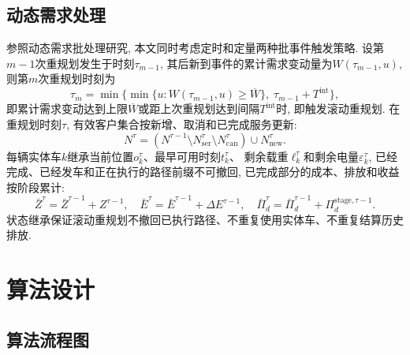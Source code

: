 \documentclass{setp-new}
\begin{document}
\subsection{动态需求处理}

参照动态需求批处理研究\cite{ref:18,ref:71},
本文同时考虑定时和定量两种批事件触发策略.
设第$m-1$次重规划发生于时刻$\tau_{m-1}$,
其后新到事件的累计需求变动量为$W(\tau_{m-1},u)$,
则第$m$次重规划时刻为
\begin{equation}
\tau_m=\min\bigl\{\min\{u:W(\tau_{m-1},u)\ge\overline W\},\;\tau_{m-1}+T^{\mathrm{int}}\bigr\},
\label{eq:trigger}
\end{equation}
即累计需求变动达到上限$\overline W$或距上次重规划达到间隔$T^{\mathrm{int}}$时, 即触发滚动重规划.
在重规划时刻$\tau$, 有效客户集合按新增、取消和已完成服务更新:
\begin{equation}
N^\tau=(N^{\tau-1}\setminus N_{\mathrm{ser}}^\tau\setminus N_{\mathrm{can}}^\tau)\cup N_{\mathrm{new}}^\tau.
\label{eq:customer_update}
\end{equation}
每辆实体车$k$继承当前位置$o_k^\tau$、最早可用时刻$t_k^\tau$、
剩余载重$\ell_k^\tau$和剩余电量$\varepsilon_k^\tau$,
已经完成、已经发车和正在执行的路径前缀不可撤回,
已完成部分的成本、排放和收益按阶段累计:
\begin{equation}
\bar Z^\tau=\bar Z^{\tau-1}+Z^{\tau-1},\quad
\bar E^\tau=\bar E^{\tau-1}+\Delta E^{\tau-1},\quad
\bar\Pi_d^\tau=\bar\Pi_d^{\tau-1}+\Pi_d^{\mathrm{stage},\tau-1}.
\label{eq:accumulation}
\end{equation}
状态继承保证滚动重规划不撤回已执行路径、不重复使用实体车、不重复结算历史排放.


\section{算法设计}

\subsection{算法流程图}
\end{document}
